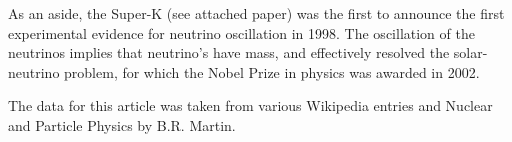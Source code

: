 \documentclass[11pt]{article}
\begin{document}
As an aside, the Super-K (see attached paper) was the first to announce the first experimental evidence for neutrino oscillation in 1998.
The oscillation of the neutrinos implies that neutrino's have mass, and effectively resolved the solar-neutrino problem, for which the Nobel Prize in physics was awarded in 2002.

The data for this article was taken from various Wikipedia entries and Nuclear and Particle Physics by B.R. Martin.
\end{document}
